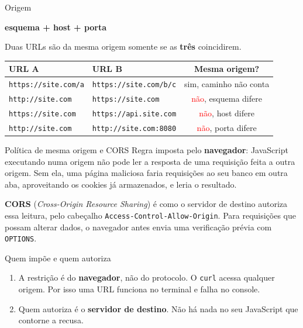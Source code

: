 \documentclass{beamer}
\newcommand{\tcr}[1]{\textcolor{red}{#1}}
\newcommand{\tcg}[1]{\textcolor{green!50!black}{#1}}
\begin{document}
\begin{frame}{Origem}
  \begin{center}
    \Large \textbf{esquema + host + porta}
  \end{center}

  \vspace{0.4cm}
  Duas URLs são da mesma origem somente se as \textbf{três} coincidirem.

  \begin{center}
    \scriptsize
    \begin{tabular}{@{}llc@{}}
      \toprule
      \textbf{URL A} & \textbf{URL B} & \textbf{Mesma origem?} \\
      \midrule
      \texttt{https://site.com/a}  & \texttt{https://site.com/b/c}    & \tcg{sim}, caminho não conta \\
      \texttt{http://site.com}     & \texttt{https://site.com}        & \tcr{não}, esquema difere \\
      \texttt{https://site.com}    & \texttt{https://api.site.com}    & \tcr{não}, host difere \\
      \texttt{http://site.com}     & \texttt{http://site.com:8080}    & \tcr{não}, porta difere \\
      \bottomrule
    \end{tabular}
  \end{center}
\end{frame}

\begin{frame}{Política de mesma origem e CORS}
  Regra imposta pelo \textbf{navegador}: JavaScript executando numa origem não
  pode ler a resposta de uma requisição feita a outra origem. Sem ela, uma
  página maliciosa faria requisições ao seu banco em outra aba, aproveitando os
  cookies já armazenados, e leria o resultado.

  \vspace{0.3cm}
  \textbf{CORS} (\textit{Cross-Origin Resource Sharing}) é como o servidor de
  destino autoriza essa leitura, pelo cabeçalho
  \texttt{Access-Control-Allow-Origin}. Para requisições que possam alterar
  dados, o navegador antes envia uma verificação prévia com \texttt{OPTIONS}.

  \begin{block}{Quem impõe e quem autoriza}
    \begin{enumerate}
      \item A restrição é do \textbf{navegador}, não do protocolo. O
            \texttt{curl} acessa qualquer origem. Por isso uma URL funciona no
            terminal e falha no console.
      \item Quem autoriza é o \textbf{servidor de destino}. Não há nada no seu
            JavaScript que contorne a recusa.
    \end{enumerate}
  \end{block}
\end{frame}
\end{document}
